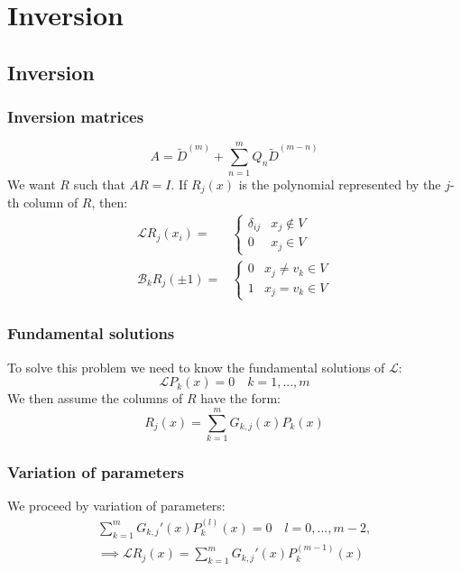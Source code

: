 \documentclass[handout]{beamer}
\begin{document}
\section{Inversion}

\subsection{Inversion}

\begin{frame}
\frametitle{Inversion matrices}
\begin{equation*}
A = \tilde{D}^{(m)} + \sum_{n=1}^m Q_n \tilde{D}^{(m-n)}
\end{equation*}
We want $R$ such that $AR = I$.
If $R_j(x)$ is the polynomial represented by the $j$-th column of $R$, then:
\begin{align*}
\mathcal{L} R_j(x_i) = & \begin{cases} \delta_{ij} & x_j \notin V \\ 0 & x_j \in V \end{cases} \\
\mathcal{B}_k R_j(\pm 1) = & \begin{cases} 0 & x_j \neq v_k \in V \\ 1 & x_j = v_k \in V \end{cases}
\end{align*}
\end{frame}

\begin{frame}
\frametitle{Fundamental solutions}
To solve this problem we need to know the fundamental solutions of $\mathcal{L}$:
\begin{equation*}
\mathcal{L} P_k(x) = 0 \quad k = 1,...,m
\end{equation*}
We then assume the columns of $R$ have the form:
\begin{equation*}
R_j(x) = \sum_{k=1}^m G_{k,j}(x) P_k(x)
\end{equation*}
\end{frame}

\begin{frame}
\frametitle{Variation of parameters}
We proceed by variation of parameters:
\begin{align*}
\sum_{k=1}^m G_{k,j}'(x) P_k^{(l)}(x) = 0 \quad l = 0,...,m-2, \\
\implies \mathcal{L} R_j(x) = \sum_{k=1}^m G_{k,j}'(x) P_k^{(m-1)}(x)
\end{align*}
\end{frame}
\end{document}

